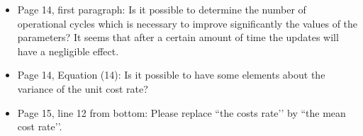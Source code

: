 \documentclass[authoryear]{elsarticle}
\begin{document}
\begin{itemize}
\item Page 14, first paragraph: Is it possible to determine the number of operational cycles which is necessary to improve significantly the values of the parameters? It seems that after a certain amount of time the updates will have a negligible effect. 

\item Page 14, Equation (14): Is it possible to have some elements about the variance of the unit cost rate?

\item Page 15, line 12 from bottom: Please replace ``the costs rate’’ by ``the mean cost rate’’.

\end{itemize}
\end{document}

